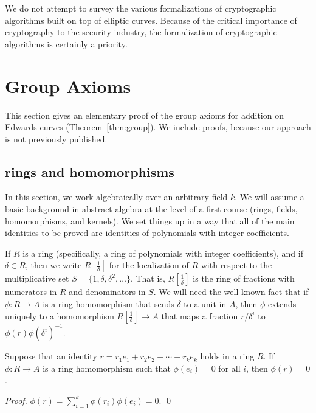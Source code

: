 \documentclass{llncs}
\newcommand{\f}[1]{\frac{1}{#1}}
\begin{document}
We do not attempt to survey the various formalizations of
cryptographic algorithms built on top of elliptic curves.  Because of
the critical importance of cryptography to the security industry, the
formalization of cryptographic algorithms is certainly a priority.

\section{Group Axioms}\label{sec:axiom}

This section gives an elementary proof of the group axioms for
addition on Edwards curves (Theorem~\ref{thm:group}).  We include
proofs, because our approach is not previously published.



\subsection{rings and homomorphisms}

In this section, we work algebraically over an arbitrary field $k$.
We will assume a basic background in abstract algebra at the level of
a first course (rings, fields, homomorphisms, and kernels).  We set
things up in a way that all of the main identities to be proved are
identities of polynomials with integer coefficients.

If $R$ is a ring (specifically, a ring of polynomials with integer
coefficients), and if $\delta\in R$, then we write $R[\f{\delta}]$ for
the localization of $R$ with respect to the multiplicative set
$S=\{1,\delta,\delta^2,\ldots\}$.  That is, $R[\f{\delta}]$ is the
ring of fractions with numerators in $R$ and denominators in $S$.  We
will need the well-known fact that if $\phi:R\to A$ is a ring
homomorphism that sends $\delta$ to a unit in $A$, then $\phi$ extends
uniquely to a homomorphism $R[\f{\delta}]\to A$ that maps a fraction
$r/\delta^i$ to $\phi(r)\phi(\delta^i)^{-1}$.

\begin{lemma} Suppose that an identity $r = r_1 e_1 +
  r_2 e_2 +\cdots + r_k e_k$ holds in a ring $R$.  If $\phi:R\to A$ is
  a ring homomorphism such that $\phi(e_i) =0$ for all $i$, then
  $\phi(r)=0$.
\end{lemma}

\begin{proof}
$\phi(r) = \sum_{i=1}^k \phi(r_i) \phi(e_i) = 0.$
\qed\end{proof}
\end{document}

